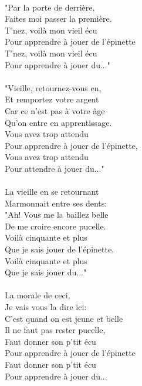 \\"Par la porte de derrière,
\\Faites moi passer la première.
\\T'nez, voilà mon vieil écu
\\Pour apprendre à jouer de l'épinette
\\T'nez, voilà mon vieil écu
\\Pour apprendre à jouer du..."
\\\\"Vieille, retournez-vous en, ~~ \bissimple
\\Et remportez votre argent ~~~ \bissimple
\\Car ce n'est pas à votre âge
\\Qu'on entre en apprentissage.
\\Vous avez trop attendu
\\Pour apprendre à jouer de l'épinette,
\\Vous avez trop attendu
\\Pour attendre à jouer du..."
\\\\La vieille en se retournant ~~~~~~ \bissimple
\\Marmonnait entre ses dents: ~~ \bissimple
\\"Ah! Vous me la baillez belle
\\De me croire encore pucelle.
\\Voilà cinquante et plus
\\Que je sais jouer de l'épinette.
\\Voilà cinquante et plus
\\Que je sais jouer du..."
\\\\La morale de ceci, ~~~~~~~~~ \bissimple
\\Je vais vous la dire ici: ~~ \bissimple
\\C'est quand on est jeune et belle
\\Il ne faut pas rester pucelle,
\\Faut donner son p'tit écu
\\Pour apprendre à jouer de l'épinette
\\Faut donner son p'tit écu
\\Pour apprendre à jouer du...


\breakpage